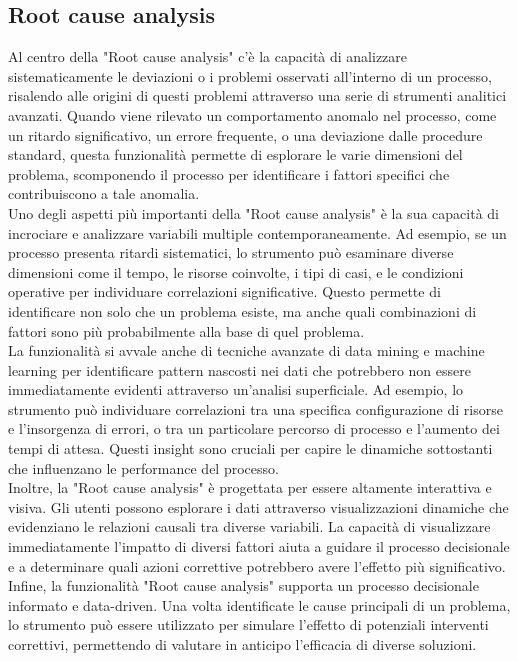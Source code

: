 \documentclass{article}
\begin{document}
\subsection{Root cause analysis}
Al centro della "Root cause analysis" c'è la capacità di analizzare sistematicamente le deviazioni o i problemi osservati all'interno di un processo, risalendo alle origini di questi problemi attraverso una serie di strumenti analitici avanzati. Quando viene rilevato un comportamento anomalo nel processo, come un ritardo significativo, un errore frequente, o una deviazione dalle procedure standard, questa funzionalità permette di esplorare le varie dimensioni del problema, scomponendo il processo per identificare i fattori specifici che contribuiscono a tale anomalia.\\
Uno degli aspetti più importanti della "Root cause analysis" è la sua capacità di incrociare e analizzare variabili multiple contemporaneamente. Ad esempio, se un processo presenta ritardi sistematici, lo strumento può esaminare diverse dimensioni come il tempo, le risorse coinvolte, i tipi di casi, e le condizioni operative per individuare correlazioni significative. Questo permette di identificare non solo che un problema esiste, ma anche quali combinazioni di fattori sono più probabilmente alla base di quel problema.\\
La funzionalità si avvale anche di tecniche avanzate di data mining e machine learning per identificare pattern nascosti nei dati che potrebbero non essere immediatamente evidenti attraverso un'analisi superficiale. Ad esempio, lo strumento può individuare correlazioni tra una specifica configurazione di risorse e l'insorgenza di errori, o tra un particolare percorso di processo e l'aumento dei tempi di attesa. Questi insight sono cruciali per capire le dinamiche sottostanti che influenzano le performance del processo.\\
Inoltre, la "Root cause analysis" è progettata per essere altamente interattiva e visiva. Gli utenti possono esplorare i dati attraverso visualizzazioni dinamiche che evidenziano le relazioni causali tra diverse variabili. La capacità di visualizzare immediatamente l'impatto di diversi fattori aiuta a guidare il processo decisionale e a determinare quali azioni correttive potrebbero avere l'effetto più significativo.\\
Infine, la funzionalità "Root cause analysis" supporta un processo decisionale informato e data-driven. Una volta identificate le cause principali di un problema, lo strumento può essere utilizzato per simulare l'effetto di potenziali interventi correttivi, permettendo di valutare in anticipo l'efficacia di diverse soluzioni.
\end{document}
